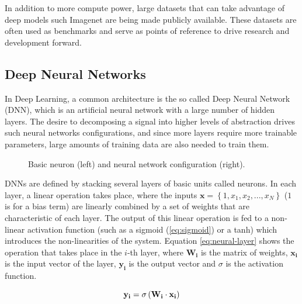 In addition to more compute power, large datasets that can take advantage of deep models such Imagenet \cite{russakovsky2015imagenet} are being made publicly available. These datasets are often used as benchmarks and serve as points of reference to drive research and development forward.


\subsection{Deep Neural Networks}

In Deep Learning, a common architecture is the so called Deep Neural Network (DNN), which is an artificial neural network with a large number of hidden layers. The desire to decomposing a signal into higher levels of abstraction drives such neural networks configurations, and since more layers require more trainable parameters, large amounts of training data are also needed to train them.

\begin{figure}[h]
    \centering
    \scalebox{.75} {  }
    \scalebox{.5} {  }
    \caption{Basic neuron (left) and neural network configuration (right).}
    \label{fig:neural-net}
\end{figure}

DNNs are defined by stacking several layers of basic units called neurons. In each layer, a linear operation takes place, where the inputs $\mathbf{x}= \left \{ 1, x_1, x_2, ..., x_N \right \}$ ($1$ is for a bias term) are linearly combined by a set of weights that are characteristic of each layer. The output of this linear operation is fed to a non-linear activation function (such as a sigmoid (\ref{eq:sigmoid}) or a tanh) which introduces the non-linearities of the system. Equation \ref{eq:neural-layer} shows the operation that takes place in the $i$-th layer, where $\mathbf{W_i}$  is the matrix of weights, $\mathbf{x_i}$ is the input vector of the layer, $\mathbf{y_i}$ is the output vector and $\sigma$ is the activation function.

\begin{equation}
    \centering
    \mathbf{y_i} = \sigma \left ( \mathbf{W_i} \cdot \mathbf{x_i} \right )
    \label{eq:neural-layer}
\end{equation}

